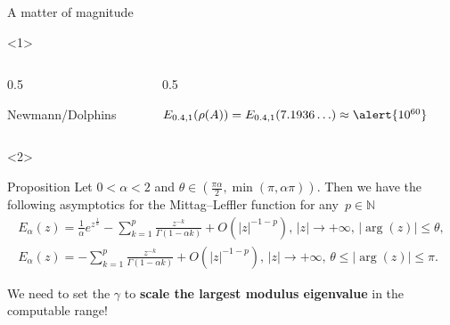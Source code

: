 \documentclass[aspectratio=169,xcolor=dvipsnames]{beamer}
\begin{document}
\begin{frame}{\faEye\; A matter of magnitude}
\begin{onlyenv}<1>	
\begin{columns}
\begin{column}{0.5\columnwidth}
\centering
{}

Newmann/Dolphins
\end{column}
\begin{column}{0.5\columnwidth}
\centering


$E_{0.4,1}(\rho(A)) = E_{0.4,1}(7.1936\ldots) \approx \alert{10^{60}}$
\end{column}
\end{columns}
\end{onlyenv}
\begin{onlyenv}<2>

\begin{alertblock}{Proposition \parencite[Proposition~3.6]{MR3244285}}
Let $0<\alpha<2$ and $\theta \in (\frac{\pi \alpha}{2},\min(\pi,\alpha\pi))$. Then we have the following asymptotics for the Mittag--Leffler function for any~$p \in \mathbb{N}$
\begin{eqnarray*}
	E_{\alpha}(z) = \frac{1}{\alpha} e^{z^{\frac{1}{\alpha}}} - \sum_{k=1}^{p} \frac{z^{-k}}{\Gamma(1-\alpha k)} + O(\lvert z\rvert^{-1-p}), \, \lvert z \rvert \rightarrow + \infty, \, \lvert \arg(z)\rvert \leq \theta,\\
	E_{\alpha}(z) = - \sum_{k=1}^{p} \frac{z^{-k}}{\Gamma(1-\alpha k)} + O(\lvert z\rvert^{-1-p}), \, \lvert z \rvert \rightarrow + \infty, \, \theta \leq \lvert \arg(z)\rvert \leq \pi.\nonumber
\end{eqnarray*}
\end{alertblock}

\begin{center}
We need to set the $\gamma$ to \alert{\textbf{scale the largest modulus eigenvalue}} in the computable range!
\end{center}

\end{onlyenv}
\end{frame}
\end{document}
